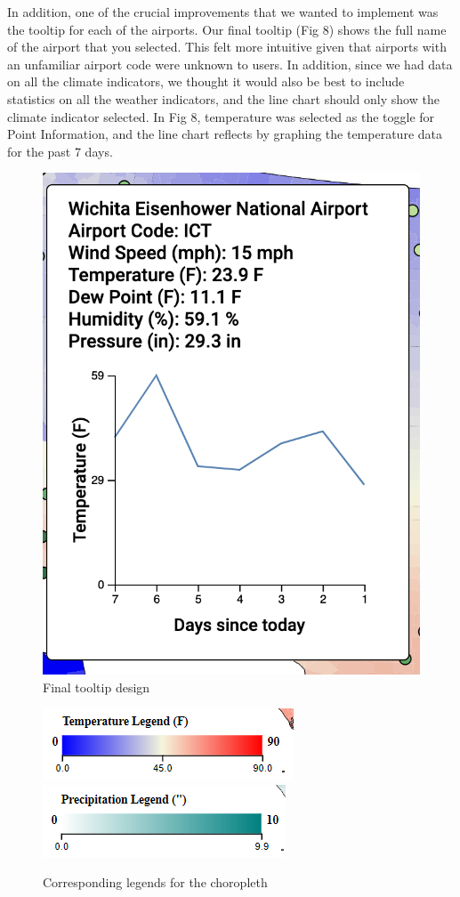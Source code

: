 \documentclass[10pt,twocolumn,twoside]{opticajnl}
\begin{document}
In addition, one of the crucial improvements that we wanted to implement was the tooltip for each of the airports. Our final tooltip (Fig 8) shows the full name of the airport that you selected. This felt more intuitive given that airports with an unfamiliar airport code were unknown to users. In addition, since we had data on all the climate indicators, we thought it would also be best to include statistics on all the weather indicators, and the line chart should only show the climate indicator selected. In Fig 8, temperature was selected as the toggle for Point Information, and the line chart reflects by graphing the temperature data for the past 7 days.

\begin{figure}
    \centering
    \includegraphics[scale=0.5]{images/img9.png}
    \caption{Final tooltip design}
\end{figure}

\begin{figure}
	\centering
	\includegraphics[scale=0.35]{images/legend.png}
	\includegraphics[scale=0.35]{images/legendP.png}
	\caption{Corresponding legends for the choropleth}
\end{figure}
\end{document}

